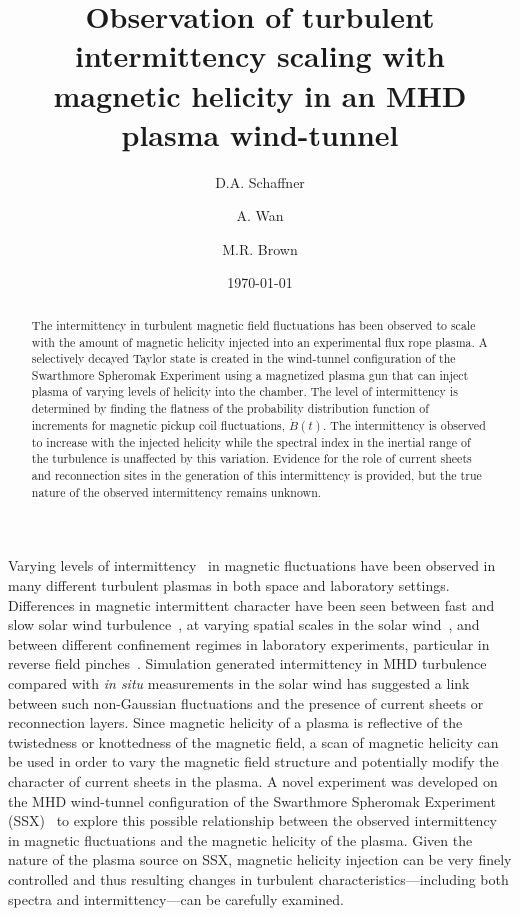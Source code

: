\documentclass[aps,prl,amsmath,amssymb,reprint,superscriptaddress]{revtex4-1} %
\begin{document}
\title{Observation of turbulent intermittency scaling with magnetic helicity in an MHD plasma wind-tunnel}

\author{D.A. Schaffner}
\author{A. Wan}
\author{M.R. Brown}
\date{\today}
\begin{abstract}
The intermittency in turbulent magnetic field fluctuations has been observed to scale with the amount of magnetic helicity injected into an experimental flux rope plasma. A selectively decayed Taylor state is created in the wind-tunnel configuration of the Swarthmore Spheromak Experiment using a magnetized plasma gun that can inject plasma of varying levels of helicity into the chamber. The level of intermittency is determined by finding the flatness of the probability distribution function of increments for magnetic pickup coil fluctuations, $\dot{B}(t)$. The intermittency is observed to increase with the injected helicity while the spectral index in the inertial range of the turbulence is unaffected by this variation. Evidence for the role of current sheets and reconnection sites in the generation of this intermittency is provided, but the true nature of the observed intermittency remains unknown.
\end{abstract}

\maketitle

Varying levels of intermittency~\cite{frisch95} in magnetic fluctuations have been observed in many different turbulent plasmas in both space and laboratory settings. Differences in magnetic intermittent character have been seen between fast and slow solar wind turbulence~\cite{sorrisovalvo99}, at varying spatial scales in the solar wind~\cite{wan12}, and between different confinement regimes in laboratory experiments, particular in reverse field pinches~\cite{sorrisovalvo01,marrelli05}. Simulation generated intermittency in MHD turbulence~\cite{Greco08,Greco09,Wan09,Servidio11b} compared with {\it in situ} measurements in the solar wind has suggested a link between such non-Gaussian fluctuations and the presence of current sheets or reconnection layers. Since magnetic helicity of a plasma is reflective of the twistedness or knottedness of the magnetic field, a scan of magnetic helicity can be used in order to vary the magnetic field structure and potentially modify the character of current sheets in the plasma. A novel experiment was developed on the MHD wind-tunnel configuration of the Swarthmore Spheromak Experiment (SSX)~\cite{Gray13,schaffner14} to explore this possible relationship between the observed intermittency in magnetic fluctuations and the magnetic helicity of the plasma. Given the nature of the plasma source on SSX, magnetic helicity injection can be very finely controlled and thus resulting changes in turbulent characteristics---including both spectra and intermittency---can be carefully examined.
\end{document}
